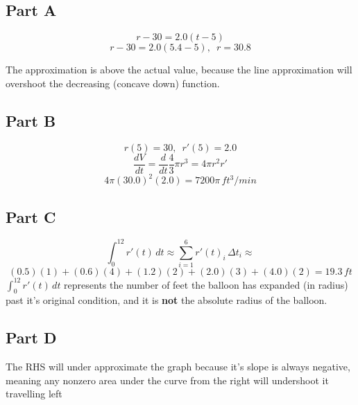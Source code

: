 \subsection{Part A}
\[ r - 30 = 2.0(t - 5) \]
\[ r - 30 = 2.0(5.4 - 5), \enspace r = 30.8 \]
\begin{center}
\end{center}
The approximation is above the actual value, because the line approximation will overshoot the decreasing (concave down) function.

\subsection{Part B}
\[ r(5) = 30, \enspace r'(5) = 2.0 \]
\[ \frac{dV}{dt} = \frac{d}{dt} \frac{4}{3}\pi r^3 = 4 \pi r^2 r' \]
\[ 4 \pi (30.0)^2(2.0) = 7200\pi \, ft^3/min \]

\subsection{Part C}
\[ \int_{0}^{12} r'(t)\,dt \approx \sum _{i=1}^{6}r'(t)_{i}\,\Delta t_{i} \approx \]
\[ (0.5)(1) + (0.6)(4) + (1.2)(2) + (2.0)(3) + (4.0)(2) = 19.3 \, ft\]
\underline{$\int_{0}^{12} r'(t)\,dt$} represents the number of feet the balloon has expanded (in radius) past it's original condition, and it is \textbf{not} the absolute radius of the balloon.

\subsection{Part D}
\begin{center}
\end{center}

The RHS will under approximate the graph because it's slope is always negative, meaning any nonzero area under the curve from the right will undershoot it travelling left
